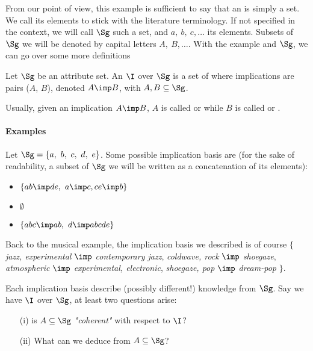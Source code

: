 \vspace{1.2em}

From our point of view, this example is sufficient to say that an 
 is simply a set. We call its elements 
 to stick with the literature terminology. If not specified
in the context, we will call $\Sg$ such a set, and $a, \ b, \ c,\dots$ its 
elements. Subsets of $\Sg$ we will be denoted by capital letters $A, \ B, 
\dots$. With the example and $\Sg$, we can go over some more definitions

\begin{definition} Let $\Sg$ be an attribute set. An 
 $\I$ over $\Sg$ is a set of  
where implications are pairs ($A$, $B$), denoted $A \imp B$, with $A, B 
\subseteq \Sg$.
	
\end{definition}

\noindent Usually, given an implication $A \imp B$, $A$ is called 
or  while $B$ is called  or .

\paragraph{Examples} Let $\Sg = \{a, \ b, \ c, \ d, \ e \}$. Some 
possible implication basis are (for the sake of readability, a subset of 
$\Sg$ we will be written as a concatenation of its elements):
\begin{itemize}
	\item $\{ab \imp de, \ a \imp c, ce \imp b \}$
	\item $\emptyset$
	\item $ \{ abc \imp ab, \ d \imp abcde \}$
\end{itemize}

Back to the musical example, the implication basis we described is of course 
$\{$ \textit{jazz, experimental} $\imp$ \textit{contemporary 
jazz}, \textit{coldwave, rock}  $\imp$ \textit{shoegaze}, \textit{atmospheric} 
$\imp$ \textit{experimental, electronic}, \textit{shoegaze, pop} $\imp$ 
\textit{dream-pop} $\}$.

\vspace{1.2em}

Each implication basis describe (possibly different!) knowledge from $\Sg$. Say
we have $\I$ over $\Sg$, at least two questions arise:
\begin{itemize}
	\item[(i)] is $A \subseteq \Sg$ \textit{"coherent"} with respect to $\I$?  
	\item[(ii)] What can we deduce from $A \subseteq \Sg$?	
\end{itemize}


